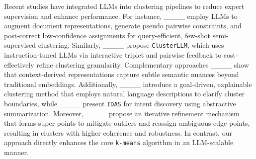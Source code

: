 Recent studies have integrated LLMs into clustering pipelines to reduce expert supervision and enhance performance. For instance, ____ employ LLMs to augment document representations, generate pseudo pairwise constraints, and post-correct low-confidence assignments for query-efficient, few-shot semi-supervised clustering. Similarly, ____ propose \texttt{ClusterLLM}, which uses instruction-tuned LLMs via interactive triplet and pairwise feedback to cost-effectively refine clustering granularity. Complementary approaches ____ show that context-derived representations capture subtle semantic nuances beyond traditional embeddings. Additionally, ____ introduce a goal-driven, explainable clustering method that employs natural language descriptions to clarify cluster boundaries, while ____ present \texttt{IDAS} for intent discovery using abstractive summarization. Moreover, ____ propose an iterative refinement mechanism that forms super-points to mitigate outliers and reassign ambiguous edge points, resulting in clusters with higher coherence and robustness. In contrast, our approach directly enhances the core \texttt{k-means} algorithm in an LLM-scalable manner.
